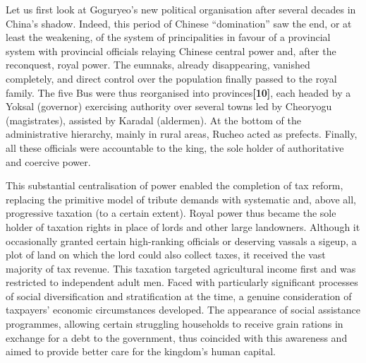 \documentclass[11pt,a4paper]{article}
\begin{document}
Let us first look at Goguryeo's new political organisation after several decades in China's shadow. Indeed, this period of Chinese ``domination'' saw the end, or at least the weakening, of the system of principalities in favour of a provincial system with provincial officials relaying Chinese central power and, after the reconquest, royal power. The eumnaks, already disappearing, vanished completely, and direct control over the population finally passed to the royal family. The five Bus were thus reorganised into provinces\textbf{{[}10{]}}, each headed by a Yoksal (governor) exercising authority over several towns led by Cheoryogu (magistrates), assisted by Karadal (aldermen). At the bottom of the administrative hierarchy, mainly in rural areas, Rucheo acted as prefects. Finally, all these officials were accountable to the king, the sole holder of authoritative and coercive power.

This substantial centralisation of power enabled the completion of tax reform, replacing the primitive model of tribute demands with systematic and, above all, progressive taxation (to a certain extent). Royal power thus became the sole holder of taxation rights in place of lords and other large landowners. Although it occasionally granted certain high-ranking officials or deserving vassals a sigeup, a plot of land on which the lord could also collect taxes, it received the vast majority of tax revenue. This taxation targeted agricultural income first and was restricted to independent adult men. Faced with particularly significant processes of social diversification and stratification at the time, a genuine consideration of taxpayers' economic circumstances developed. The appearance of social assistance programmes, allowing certain struggling households to receive grain rations in exchange for a debt to the government, thus coincided with this awareness and aimed to provide better care for the kingdom's human capital.
\end{document}
